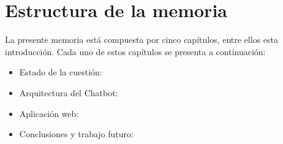 \section{Estructura de la memoria}

La presente memoria está compuesta por cinco capítulos, entre ellos esta introducción. Cada uno de estos capítulos se presenta a continuación: 

\begin{itemize}
	\item Estado de la cuestión: 
	\item Arquitectura del Chatbot:
	\item Aplicación web:
	\item Conclusiones y trabajo futuro:
\end{itemize}

